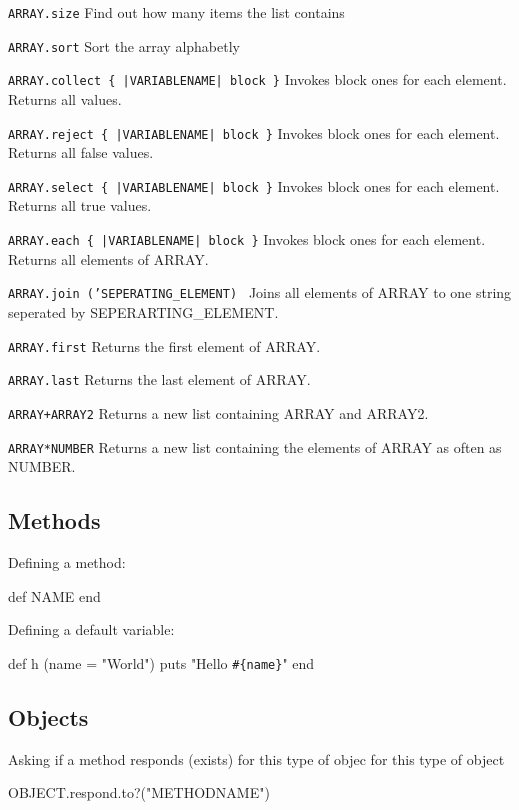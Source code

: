 \documentclass[10pt,a4paper]{scrartcl}
\begin{document}
\begin{description}
\item{\texttt{ARRAY.size}} Find out how many items the list contains
\item{\texttt{ARRAY.sort}} Sort the array alphabetly
\item{\texttt{ARRAY.collect \{ |VARIABLENAME| block \}}} Invokes block ones for each element. Returns all values.
\item{\texttt{ARRAY.reject \{ |VARIABLENAME| block \}}} Invokes block ones for each element. Returns all false values.
\item{\texttt{ARRAY.select \{ |VARIABLENAME| block \}}} Invokes block ones for each element. Returns all true values.
\item{\texttt{ARRAY.each \{ |VARIABLENAME| block \}}} Invokes block ones for each element. Returns all elements of ARRAY.
\item{\texttt{ARRAY.join ('SEPERATING\_ELEMENT)  }} Joins all elements of ARRAY to one string seperated by SEPERARTING\_ELEMENT.
\item{\texttt{ARRAY.first}} Returns the first element of ARRAY.
\item{\texttt{ARRAY.last}} Returns the last element of ARRAY.
\item{\texttt{ARRAY+ARRAY2}} Returns a new list containing ARRAY and ARRAY2.
\item{\texttt{ARRAY*NUMBER}} Returns a new list containing the elements of ARRAY as often as NUMBER.
\end{description}

\subsection{Methods} 

Defining a method:

\begin{terminalcode}
def NAME
end
\end{terminalcode}

\noindent Defining a default variable:

\begin{terminalcode}
def h (name = "World")
puts "Hello \verb$#{name}$"
end
\end{terminalcode}

\subsection{Objects}

Asking if a method responds (exists) for this type of objec for this type of object

\begin{terminalcode}
OBJECT.respond.to?("METHODNAME")
\end{terminalcode}


\end{document}
